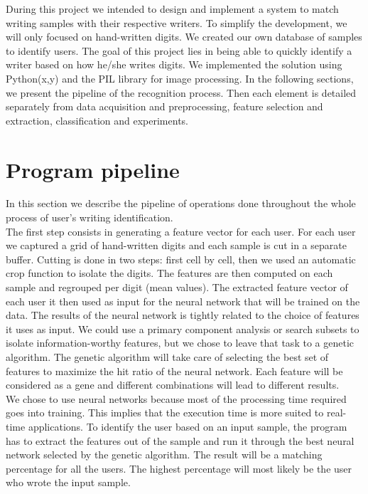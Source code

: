 \documentclass[a4paper]{article}
\begin{document}
{During this project we intended to design and implement a system to match writing samples with their respective writers. To simplify the development, we will only focused on hand-written digits. We created our own database of samples to identify users. The goal of this project lies in being able to quickly identify a writer based on how he/she writes digits. We implemented the solution using Python(x,y) and the PIL library for image processing. In the following sections, we present the pipeline of the recognition process. Then each element is detailed separately from data acquisition and preprocessing, feature selection and extraction, classification and experiments.

\section{Program pipeline}

In this section we describe the pipeline of operations done throughout the whole process of user’s writing identification.\\

The first step consists in generating a feature vector for each user. For each user we captured a grid of hand-written digits and each sample is cut in a separate buffer. Cutting is done in two steps: first cell by cell, then we used an automatic crop function to isolate the digits. The features are then computed on each sample and regrouped per digit (mean values).  The extracted feature vector of each user it then used as input for the neural network that will be trained on the data. The results of the neural network is tightly related to the choice of features it uses as input. We could use a primary component analysis or search subsets to isolate information-worthy features, but we chose to leave that task to a genetic algorithm. The genetic algorithm will take care of selecting the best set of features to maximize the hit ratio of the neural network. Each feature will be considered as a gene and different combinations will lead to different results.\\

We chose to use neural networks because most of the processing time required goes into training. This implies that the execution time is more suited to real-time applications. To identify the user based on an input sample, the program has to extract the features out of the sample and run it through the best neural network selected by the genetic algorithm. The result will be a matching percentage for all the users. The highest percentage will most likely be the user who wrote the input sample.

}
\end{document}

